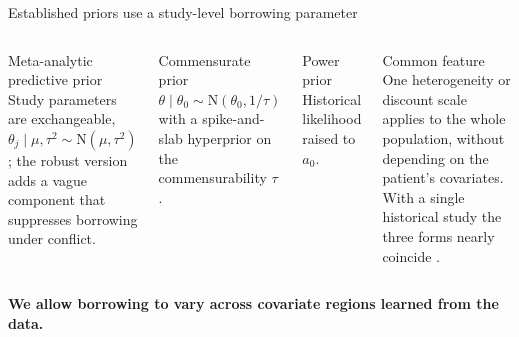 \documentclass[11pt,aspectratio=169]{beamer}
\newcommand{\Normal}{\mathrm{N}}
\begin{document}
\begin{frame}{Established priors use a study-level borrowing parameter}
  \small
  \begin{columns}[T,onlytextwidth]
      \begin{block}{Meta-analytic predictive prior \citep{Neuenschwander2010MAP,schmidli2014robust}}
        Study parameters are exchangeable, $\theta_j\mid\mu,\tau^2\sim\Normal(\mu,\tau^2)$; the robust version adds a vague component that suppresses borrowing under conflict.
      \end{block}
      \begin{block}{Commensurate prior \citep{Hobbs2011,Hobbs2012}}
        $\theta\mid\theta_0\sim\Normal(\theta_0,1/\tau)$ with a spike-and-slab hyperprior on the commensurability $\tau$.
      \end{block}
      \begin{block}{Power prior \citep{IbrahimChen2000}}
        Historical likelihood raised to $a_0$.
      \end{block}
      \begin{alertblock}{Common feature}
        One heterogeneity or discount scale applies to the whole population, without depending on the patient's covariates. With a single historical study the three forms nearly coincide \citep{RoverFriede2025}.
      \end{alertblock}
  \end{columns}
  \vspace{0.4em}
  \centering
  \textbf{We allow borrowing to vary across covariate regions learned from the data.}
\end{frame}
\end{document}

